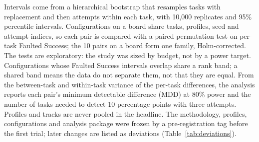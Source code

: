 Intervals come from a hierarchical bootstrap that resamples tasks with replacement and then attempts within each task, with 10,000 replicates and 95\% percentile intervals.
Configurations on a board share tasks, profiles, seed and attempt indices, so each pair is compared with a paired permutation test on per-task Faulted Success; the 10 pairs on a board form one family, Holm-corrected.
The tests are exploratory: the study was sized by budget, not by a power target.
Configurations whose Faulted Success intervals overlap share a rank band; a shared band means the data do not separate them, not that they are equal.
From the between-task and within-task variance of the per-task differences, the analysis reports each pair's minimum detectable difference (MDD) at 80\% power and the number of tasks needed to detect 10 percentage points with three attempts.
Profiles and tracks are never pooled in the headline.
The methodology, profiles, configurations and analysis package were frozen by a pre-registration tag before the first trial; later changes are listed as deviations (Table~\ref{tab:deviations}).
